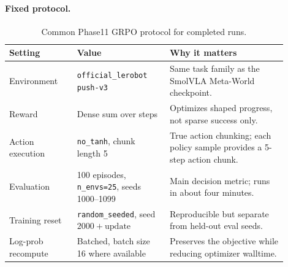 \paragraph{Fixed protocol.}
\begin{table}[h]
\centering
\small
\begin{tabular}{p{0.22\linewidth}p{0.30\linewidth}p{0.38\linewidth}}
\toprule
Setting & Value & Why it matters \\
\midrule
Environment & \texttt{official\_lerobot} \texttt{push-v3} & Same task family as the SmolVLA Meta-World checkpoint. \\
Reward & Dense sum over steps & Optimizes shaped progress, not sparse success only. \\
Action execution & \texttt{no\_tanh}, chunk length 5 & True action chunking; each policy sample provides a 5-step action chunk. \\
Evaluation & 100 episodes, \texttt{n\_envs=25}, seeds 1000--1099 & Main decision metric; runs in about four minutes. \\
Training reset & \texttt{random\_seeded}, seed $2000+\mathrm{update}$ & Reproducible but separate from held-out eval seeds. \\
Log-prob recompute & Batched, batch size 16 where available & Preserves the objective while reducing optimizer walltime. \\
\bottomrule
\end{tabular}
\caption{Common Phase11 GRPO protocol for completed runs.}
\label{tab:phase11-protocol}
\end{table}

